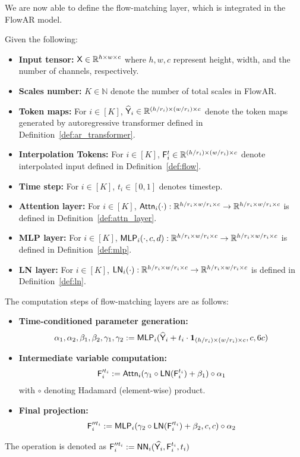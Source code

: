 We are now able to define the flow-matching layer, which is integrated in the FlowAR model.
\begin{definition}\label{def:flow_matching_architecture}
Given the following:
\begin{itemize}
    \item {\bf Input tensor:} $\mathsf{X} \in \mathbb{R}^{h \times w \times c}$ where $h,w,c$ represent height, width, and the number of channels, respectively.
    \item {\bf Scales number:} $K \in \mathbb{N}$ denote the number of total scales in FlowAR.
    \item {\bf Token maps:} For $i \in [K]$, $\widehat{\mathsf{Y}}_i \in \mathbb{R}^{(h / r_i) \times (w/r_i) \times c}$ denote the token maps generated by autoregressive transformer defined in Definition~\ref{def:ar_transformer}.
    \item {\bf Interpolation Tokens:} For $i \in [K]$, $\mathsf{F}_i^t \in \mathbb{R}^{(h / r_i) \times (w/r_i) \times c}$ denote interpolated input defined in Definition~\ref{def:flow}.
    \item {\bf Time step:} For $i \in [K]$, $t_i \in [0,1]$ denotes timestep.
    \item {\bf Attention layer:}  For $i \in [K]$, $\mathsf{Attn}_i(\cdot):\mathbb{R}^{h/r_i \times w/r_i \times c} \to \mathbb{R}^{h/r_i \times w/r_i \times c}$ is defined in Definition~\ref{def:attn_layer}.
    \item {\bf MLP layer:}  For $i \in [K]$, $\mathsf{MLP}_i(\cdot,c,d):\mathbb{R}^{h/r_i \times w/r_i \times c} \to \mathbb{R}^{h/r_i \times w/r_i \times c}$ is defined in Definition~\ref{def:mlp}.
    \item {\bf LN layer:} For $i \in [K]$, $\mathsf{LN}_i(\cdot):\mathbb{R}^{h/r_i \times w/r_i \times c} \to \mathbb{R}^{h/r_i \times w/r_i \times c}$ is defined in Definition~\ref{def:ln}.
\end{itemize}
The computation steps of flow-matching layers are as follows:
\begin{itemize}
    \item {\bf Time-conditioned parameter generation:}
    \begin{align*}
        \alpha_1, \alpha_2, \beta_1, \beta_2, \gamma_1, \gamma_2:=  \mathsf{MLP}_i(\widehat{\mathsf{Y}}_i + t_i \cdot {\bf 1}_{(h / r_i) \times (w/r_i) \times c},c,6c)
    \end{align*}
    \item {\bf Intermediate variable computation:}
    \begin{align*}
        \mathsf{F}'^{t_i}_i:= \mathsf{Attn}_i (\gamma_1 \circ \mathsf{LN}(\mathsf{F}_i^{t_i}) + \beta_1) \circ \alpha_1
    \end{align*}
    with $\circ$ denoting Hadamard (element-wise) product.
    \item {\bf Final projection:}
    \begin{align*}
        \mathsf{F}''^{t_i}_i := \mathsf{MLP}_i(\gamma_2 \circ \mathsf{LN}(\mathsf{F}'^{t_i}_i)+ \beta_2,c,c) \circ \alpha_2
    \end{align*}
\end{itemize}
The operation is denoted as $\mathsf{F}''^{t_i}_i := \mathsf{NN}_i(\widehat{\mathsf{Y}_i},\mathsf{F}_i^{t_i},t_i)$
\end{definition}


